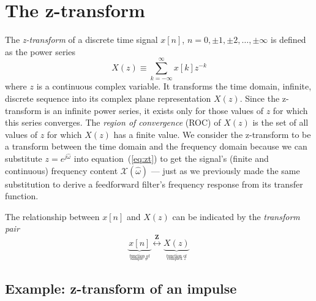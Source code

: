 \section{The z-transform}
The \emph{z-transform} of a discrete time signal $x[n]$, $n=0, \pm 1,
\pm 2, \ldots, \pm\infty$ is defined as the power series
\begin{equation}
X(z) \equiv \sum_{k=-\infty}^{\infty} x[k] z^{-k}
\label{eq:zt}
\end{equation}
where $z$ is a continuous complex variable. It transforms the time
domain, infinite, discrete sequence into its complex plane
representation $X(z)$. Since the z-transform is an infinite power
series, it exists only for those values of $z$ for which this series
converges. The \emph{region of convergence} (ROC) of $X(z)$ is the set
of all values of $z$ for which $X(z)$ has a finite value. We consider
the z-transform to be a transform between the time domain and the
frequency domain because we can substitute $z=e^{j\hat{\omega}}$ into
equation~(\ref{eq:zt}) to get the signal's (finite and continuous)
frequency content $\mathcal{X}(\hat{\omega})$ --- just as we
previously made the same substitution to derive a feedforward filter's
frequency response from its transfer function.

The relationship between $x[n]$ and $X(z)$ can be indicated
by the \emph{transform pair}
\begin{equation}
\underbrace{x[n]}_{\stackrel{\text{function of}}{_\text{sample \#}}}
   \stackrel{\mathbf{Z}}{\longleftrightarrow} 
   \underbrace{X(z)}_{\stackrel{\text{function of}}{_\text{complex $z$}}}
\end{equation}


\subsection{Example: z-transform of an impulse}
\label{sc:zx-impulse}


